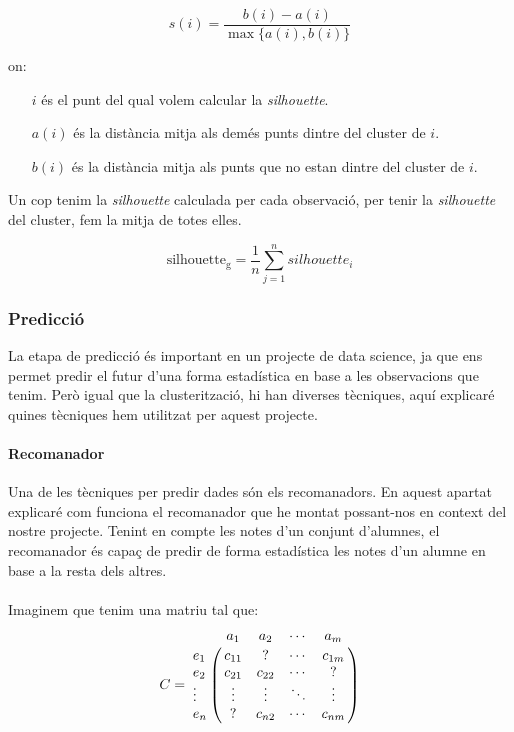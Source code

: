 \documentclass[12pt,a4paper,catalan]{article}
\begin{document}
$$ s(i) = \frac{b(i) - a(i)}{\max\{a(i),b(i)\}} $$

on:
\begin{itemize}[leftmargin=.5in]
	\item [$i$] és el punt del qual volem calcular la \textit{silhouette}.
	\item [$a(i)$] és la distància mitja als demés punts dintre del cluster de $i$.
	\item [$b(i)$] és la distància mitja als punts que no estan dintre del cluster de $i$.
\end{itemize}

Un cop tenim la \textit{silhouette} calculada per cada observació, per tenir la \textit{silhouette} del cluster, fem la mitja de totes elles.

$$ \mathrm{silhouette_g} = \frac{1}{n} \sum_{j=1}^n silhouette_i $$

\newpage

\subsubsection{Predicció}
La etapa de predicció és important en un projecte de data science, ja que ens permet predir el futur d'una forma estadística en base a les observacions que tenim. Però igual que la clusterització, hi han diverses tècniques, aquí explicaré quines tècniques hem utilitzat per aquest projecte.


\paragraph{Recomanador}
Una de les tècniques per predir dades són els recomanadors. En aquest apartat explicaré com funciona el recomanador que he montat possant-nos en context del nostre projecte. Tenint en compte les notes d'un conjunt d'alumnes, el recomanador és capaç de predir de forma estadística les notes d'un alumne en base a la resta dels altres.
\\
\\
Imaginem que tenim una matriu tal que:
$$
C = \bordermatrix{~ &         a_1   &    a_2   &   \cdots    &    a_m  \cr
                  e_1    &  c_{11}  &     ?    &   \cdots    &  c_{1m} \cr
                  e_2    &  c_{21}  &  c_{22}  &   \cdots    &    ?    \cr
                  \vdots &  \vdots  &  \vdots  &   \ddots    &  \vdots \cr
                  e_n    &    ?     &  c_{n2}  &   \cdots    &  c_{nm} \cr
                  }
$$
\end{document}
